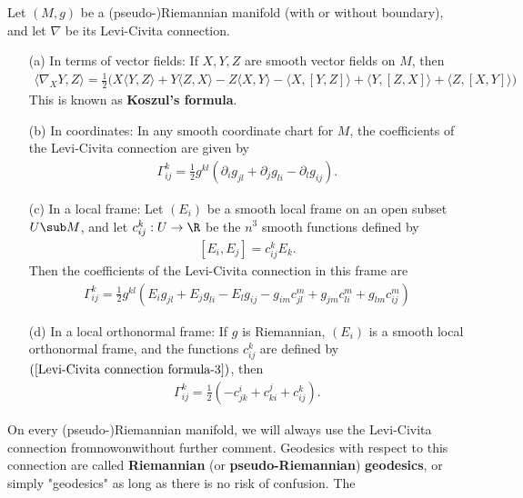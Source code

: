 \begin{corollary}
Let $(M,g)$ be a (pseudo-)Riemannian manifold (with or without boundary), and let $\nabla$ be its Levi-Civita connection.
\begin{itemize}
\item[(a)] In terms of vector fields: If $X,Y,Z$ are smooth vector fields on $M$, then
\begin{align}\label{Levi-Civita connection formula-1}
\langle\nabla_XY,Z\rangle=\frac{1}{2}\big(X\langle Y,Z\rangle+Y\langle Z,X\rangle-Z\langle X,Y\rangle-\langle X,[Y,Z]\rangle+\langle Y,[Z,X]\rangle+\langle Z,[X,Y]\rangle\big)
\end{align}
This is known as \textbf{Koszul's formula}.
\item[(b)] In coordinates: In any smooth coordinate chart for $M$, the coefficients of the Levi-Civita connection are given by
\begin{align}\label{Levi-Civita connection formula-2}
\Gamma_{ij}^k=\frac{1}{2}g^{kl}(\partial_ig_{jl}+\partial_jg_{li}-\partial_lg_{ij}).
\end{align} 
\item[(c)] In a local frame: Let $(E_i)$ be a smooth local frame on an open subset $U\sub M$, and let $c^k_{ij}:U\to\R$ be the $n^3$ smooth functions defined by 
\begin{align}\label{Levi-Civita connection formula-3}
[E_i,E_j]=c_{ij}^kE_k.
\end{align}
Then the coefficients of the Levi-Civita connection in this frame are
\begin{align}\label{Levi-Civita connection formula-4}
\Gamma_{ij}^k=\frac{1}{2}g^{kl}(E_ig_{jl}+E_jg_{li}-E_lg_{ij}-g_{im}c_{jl}^m+g_{jm}c_{li}^m+g_{lm}c_{ij}^m)
\end{align}
\item[(d)] In a local orthonormal frame: If $g$ is Riemannian, $(E_i)$ is a smooth local orthonormal frame, and the functions $c^k_{ij}$ are defined by $(\ref{Levi-Civita connection formula-3})$, 
then
\begin{align}\label{Levi-Civita connection formula-5}
\Gamma_{ij}^k=\frac{1}{2}(-c_{jk}^i+c_{ki}^j+c_{ij}^k).
\end{align}
\end{itemize}
\end{corollary}
On every (pseudo-)Riemannian manifold, we will always use the Levi-Civita connection fromnowonwithout further comment. Geodesics with respect to this 
connection are called \textbf{Riemannian} (or \textbf{pseudo-Riemannian}) \textbf{geodesics}, or simply "geodesics" as long as there is no risk of confusion. The 
